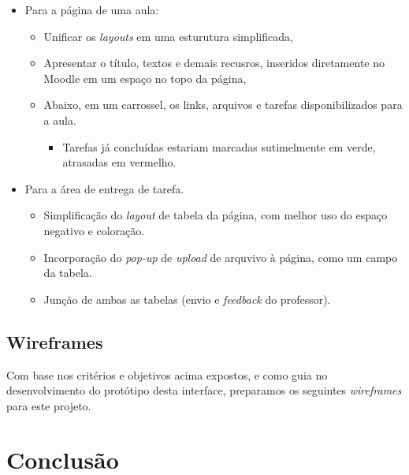 \documentclass[11pt]{article}
\begin{document}
\begin{itemize}
\item Para a página de uma aula:
\begin{itemize}
\item Unificar os \emph{layouts} em uma esturutura simplificada,
\item Apresentar o título, textos e demais recusros, inseridos
diretamente no Moodle em um espaço no topo da página,
\item Abaixo, em um carrossel, os links, arquivos e tarefas
disponibilizados para a aula.
\begin{itemize}
\item Tarefas já concluídas estariam marcadas sutimelmente em verde,
atrasadas em vermelho.
\vspace{1em}
\end{itemize}
\end{itemize}

\item Para a área de entrega de tarefa.
\begin{itemize}
\item Simplificação do \emph{layout} de tabela da página, com melhor uso do
espaço negativo e coloração.
\item Incorporação do \emph{pop-up} de \emph{upload} de arquvivo à página, como um
campo da tabela.
\item Junção de ambas as tabelas (envio e \emph{feedback} do professor).
\end{itemize}
\end{itemize}

\subsection*{Wireframes}
\label{sec:orgcf61f24}
Com base nos critérios e objetivos acima expostos, e como guia no
desenvolvimento do protótipo desta interface, preparamos os seguintes
\emph{wireframes} para este projeto.



\section*{Conclusão}
\label{sec:org48f66c3}
\end{document}
